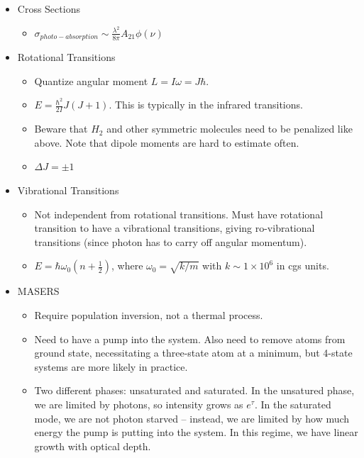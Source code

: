 \documentclass{article}
\begin{document}
\begin{itemize}
    \item Cross Sections
    \begin{itemize}
        \item $\sigma_{photo-absorption} \sim \frac{\lambda^2}{8\pi}A_{21} \phi(\nu)$
    \end{itemize}
    
    \item Rotational Transitions
    \begin{itemize}
        \item Quantize angular moment $L = I\omega = J \hbar$. 
        \item $E = \frac{\hbar^2}{2I} J\left(J+1\right)$. This is typically in the infrared transitions. 
        \item Beware that $H_2$ and other symmetric molecules need to be penalized like above. Note that dipole moments are hard to estimate often.
        \item $\Delta J = \pm 1$
    \end{itemize}
    
    \item Vibrational Transitions
    \begin{itemize}
        \item Not independent from rotational transitions. Must have rotational transition to have a vibrational transitions, giving ro-vibrational transitions (since photon has to carry off angular momentum). 
        \item $E = \hbar \omega_0 \left(n + \frac12\right)$, where $\omega_0 = \sqrt{k/m}$ with $k \sim 1\times 10^{6}$ in cgs units. 
    \end{itemize}
    
    \item MASERS
    \begin{itemize}
        \item Require population inversion, not a thermal process.
        \item Need to have a pump into the system. Also need to remove atoms from ground state, necessitating a three-state atom at a minimum, but 4-state systems are more likely in practice. 
        \item Two different phases: unsaturated and saturated. In the unsatured phase, we are limited by photons, so intensity grows as $e^{\tau}$. In the saturated mode, we are not photon starved -- instead, we are limited by how much energy the pump is putting into the system. In this regime, we have linear growth with optical depth. 
    \end{itemize}
    

\end{itemize}
\end{document}
